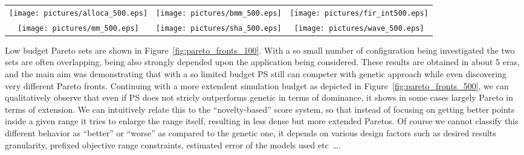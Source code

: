 \begin{table*}
  \centering
  \begin{tabular}{ccc}
    \texttt{[image: pictures/alloca\_500.eps]} &
    \texttt{[image: pictures/bmm\_500.eps]} & 
    \texttt{[image: pictures/fir\_int500.eps]} \\
    \texttt{[image: pictures/mm\_500.eps]} &
    \texttt{[image: pictures/sha\_500.eps]} &
    \texttt{[image: pictures/wave\_500.eps]} 
  \end{tabular}
  \caption{Pareto fronts found by PS and GA for a fixed budget of 500 configurations.}
  \label{fig:pareto_fronts_500}
\end{table*}

Low budget Pareto sets are shown in
Figure~\ref{fig:pareto_fronts_100}. With a so small number of
configuration being investigated the two sets are often overlapping,
being also strongly depended upon the application being considered.
These results are obtained in about 5 eras, and the main aim was
demonstrating that with a so limited budget PS still can competer with
genetic approach while even discovering very different Pareto fronts.
Continuing with a more extendent simulation budget as depicted in
Figure~\ref{fig:pareto_fronts_500}, we can qualitatively observe that
even if PS does not stricly outperforms genetic in terms of dominance, it shows in
some cases largely Pareto in terms of extension. We can intuitively
relate this to the ``novelty-based'' score system, so that instead of
focusing on getting better points inside a given range it tries to
enlarge the range itself, resulting in less dense but more extended
Paretos. Of course we cannot classify this different behavior as
``better'' or ``worse'' as compared to the genetic one, it depends on
various design factors such as desired results granularity, prefixed objective
range constraints, estimated error of the models used etc~\ldots.

